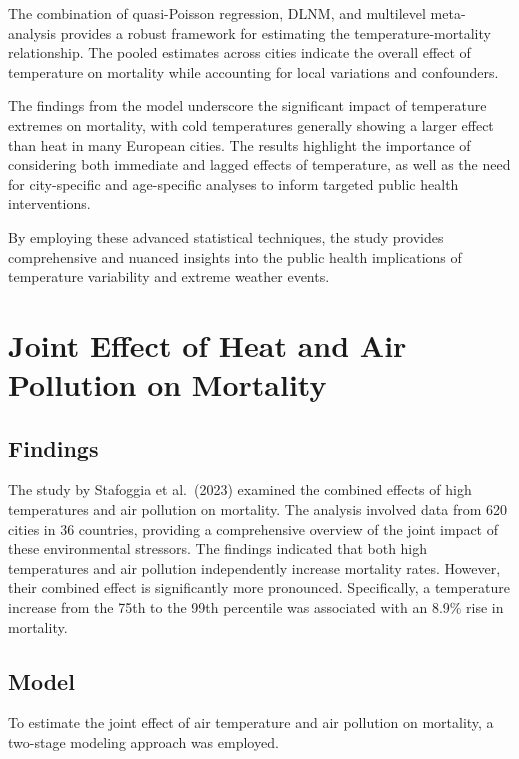 \documentclass[
]{krantz}
\begin{document}
The combination of quasi-Poisson regression, DLNM, and multilevel meta-analysis provides a robust framework for estimating the temperature-mortality relationship. The pooled estimates across cities indicate the overall effect of temperature on mortality while accounting for local variations and confounders.

The findings from the model underscore the significant impact of temperature extremes on mortality, with cold temperatures generally showing a larger effect than heat in many European cities. The results highlight the importance of considering both immediate and lagged effects of temperature, as well as the need for city-specific and age-specific analyses to inform targeted public health interventions.

By employing these advanced statistical techniques, the study provides comprehensive and nuanced insights into the public health implications of temperature variability and extreme weather events.

\section{Joint Effect of Heat and Air Pollution on Mortality}\label{joint-effect-of-heat-and-air-pollution-on-mortality}

\subsection{Findings}\label{findings-1}

The study by Stafoggia et al.~(2023) examined the combined effects of high temperatures and air pollution on mortality. The analysis involved data from 620 cities in 36 countries, providing a comprehensive overview of the joint impact of these environmental stressors. The findings indicated that both high temperatures and air pollution independently increase mortality rates. However, their combined effect is significantly more pronounced. Specifically, a temperature increase from the 75th to the 99th percentile was associated with an 8.9\% rise in mortality.

\subsection{Model}\label{model-1}

To estimate the joint effect of air temperature and air pollution on mortality, a two-stage modeling approach was employed.
\end{document}
